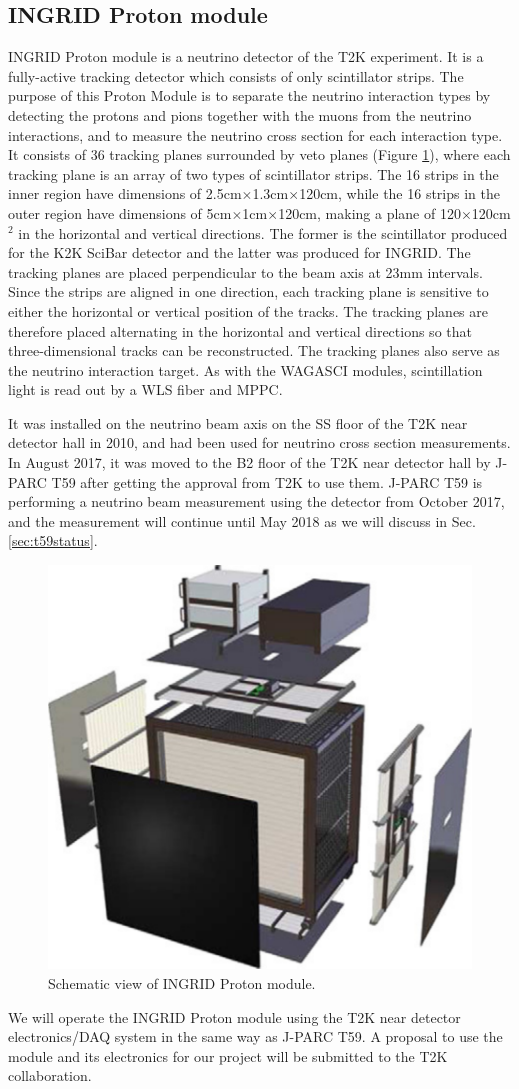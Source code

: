 \subsection{INGRID Proton module}
INGRID Proton module is a neutrino detector of the T2K experiment.
It is a fully-active tracking detector which consists of only scintillator strips. 
The purpose of this Proton Module is to separate the neutrino interaction types by detecting the protons and pions together with the muons from the neutrino interactions, and to measure the neutrino cross section for each interaction type.
It consists of 36 tracking planes surrounded by veto planes (Figure \ref{fig:proton_module}), where each tracking plane is an array of two types of scintillator strips. 
The 16 strips in the inner region have dimensions of 2.5cm$\times$1.3cm$\times$120cm, while the 16 strips in the outer region have dimensions of 5cm$\times$1cm$\times$120cm, making a plane of 120$\times$120cm$^{2}$ in the horizontal and vertical directions.
The former is the scintillator produced for the K2K SciBar detector \cite{scibar} and the latter was produced for INGRID.
The tracking planes are placed perpendicular to the beam axis at 23mm intervals.
Since the strips are aligned in one direction, each tracking plane is sensitive to either the horizontal or vertical position of the tracks.
The tracking planes are therefore placed alternating in the horizontal and vertical directions so that three-dimensional tracks can be reconstructed.
The tracking planes also serve as the neutrino interaction target.
As with the WAGASCI modules, scintillation light is read out by a WLS fiber and MPPC.


It was installed on the neutrino beam axis on the SS floor of the T2K near detector hall in 2010, and had been used for neutrino cross section measurements.
In August 2017, it was moved to the B2 floor of the T2K near detector hall by J-PARC T59 after getting the approval from T2K to use them.
J-PARC T59 is performing a  neutrino beam measurement using the detector from October 2017, and the measurement  will continue until May 2018 as we will discuss in Sec. \ref{sec:t59status}.

\begin{figure}[tbh]
\begin{center}
\includegraphics[width=0.5\linewidth]{fig/proton_module.pdf}
\end{center}
\caption{
Schematic view of INGRID Proton module.
}
\label{fig:proton_module}
\end{figure}


We will operate the INGRID Proton module using the T2K near detector electronics/DAQ system in the same way as J-PARC T59.
A proposal to use the module and its electronics for our project will be submitted to the T2K collaboration.

